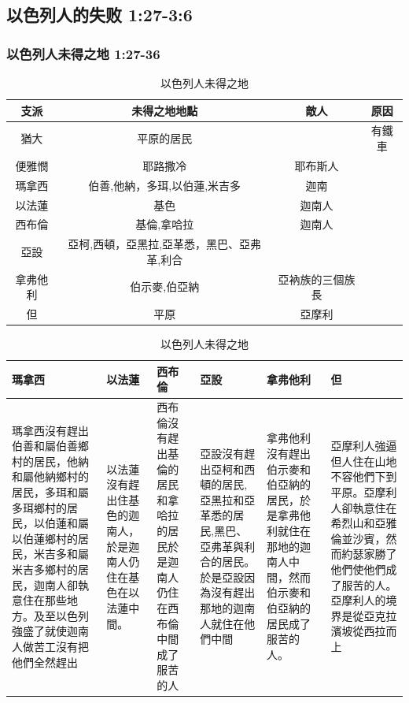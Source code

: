 \subsection{以色列人的失败 1:27-3:6}
\subsubsection{以色列人未得之地 1:27-36}
\begin{table}[!hbp]
\centering
\begin{tabular}{|c|c|c|c|}
\hline
\hline
支派                 &未得之地地點 & 敵人     &    原因               \\\hline\hline
猶大     & 平原的居民  &      &       有鐵車  \\\hline
便雅憫     & 耶路撒冷  &     耶布斯人          &       \\\hline
瑪拿西    &伯善,他納，多珥,以伯蓮,米吉多 &迦南  &    \\\hline
以法蓮 &基色 & 迦南人 & \\\hline
西布倫&基倫,拿哈拉& 迦南人  & \\\hline
亞設& 亞柯,西頓，亞黑拉,亞革悉，黑巴、亞弗革,利合&   &  \\\hline
拿弗他利& 伯示麥,伯亞納&亞衲族的三個族長& \\\hline
但&平原  &亞摩利 & \\\hline
\end{tabular}
\caption{以色列人未得之地}
\end{table}

\begin{table}[H]
\centering
\begin{tabular}{p{4.4cm}|p{1.45cm}|p{1.8cm}|p{2.55cm}|p{2.3cm}|p{3.25cm}}\hline\hline
瑪拿西&以法蓮&西布倫&亞設&拿弗他利&但\\\hline
瑪拿西沒有趕出伯善和屬伯善鄉村的居民，他納和屬他納鄉村的居民，多珥和屬多珥鄉村的居民，以伯蓮和屬以伯蓮鄉村的居民，米吉多和屬米吉多鄉村的居民，迦南人卻執意住在那些地方。及至以色列強盛了就使迦南人做苦工沒有把他們全然趕出
&以法蓮沒有趕出住基色的迦南人，於是迦南人仍住在基色在以法蓮中間。
&西布倫沒有趕出基倫的居民和拿哈拉的居民於是迦南人仍住在西布倫中間成了服苦的人
&亞設沒有趕出亞柯和西頓的居民,亞黑拉和亞革悉的居民,黑巴、亞弗革與利合的居民。於是亞設因為沒有趕出那地的迦南人就住在他們中間
&拿弗他利沒有趕出伯示麥和伯亞納的居民，於是拿弗他利就住在那地的迦南人中間，然而伯示麥和伯亞納的居民成了服苦的人。
&亞摩利人強逼但人住在山地不容他們下到平原。亞摩利人卻執意住在希烈山和亞雅倫並沙賓，然而約瑟家勝了他們使他們成了服苦的人。亞摩利人的境界是從亞克拉濱坡從西拉而上\\\hline
 \end{tabular}
\caption{以色列人未得之地}
\end{table}

